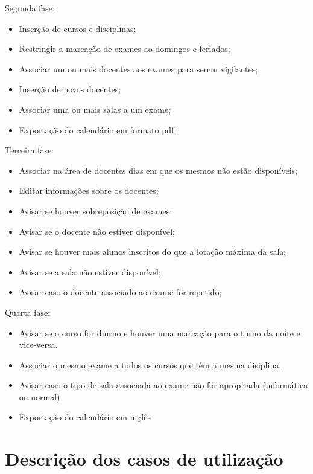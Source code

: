 \documentclass[11pt, twoside]{report}
\begin{document}
	Segunda fase:
	\begin{itemize}
		\item Inserção de cursos e disciplinas;
		\item Restringir a marcação de exames ao domingos e feriados;
		\item Associar um ou mais docentes aos exames para serem vigilantes;
		\item Inserção de novos docentes;
		\item Associar uma ou mais salas a um exame;
		\item Exportação do calendário em formato pdf;
	\end{itemize}


	Terceira fase:
	\begin{itemize}
		\item Associar na área de docentes dias em que os mesmos não estão disponíveis;
		\item Editar informações sobre os docentes;
		\item Avisar se houver sobreposição de exames;
		\item Avisar se o docente não estiver disponível;
		\item Avisar se houver mais alunos inscritos do que a lotação máxima da sala;
		\item Avisar se a sala não estiver disponível;
		\item Avisar caso o docente associado ao exame for repetido;
	\end{itemize}
	
	Quarta fase:
	\begin{itemize}
		\item Avisar se o curso for diurno e houver uma marcação para o turno da noite e vice-versa.
		\item Associar o mesmo exame a todos os cursos que têm a mesma disiplina.
		\item Avisar caso o tipo de sala associada ao exame não for apropriada (informática ou normal)
		\item Exportação do calendário em inglês
	\end{itemize}

	
	\section{Descrição dos casos de utilização}
	
	
		
\end{document}
